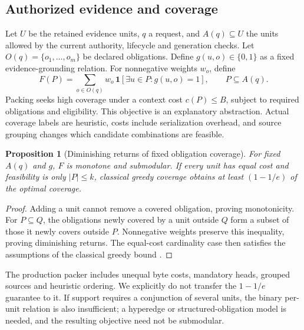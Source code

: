 \documentclass[11pt]{article}
\newtheorem{proposition}{Proposition}
\begin{document}
\subsection{Authorized evidence and coverage}
Let $U$ be the retained evidence units, $q$ a request, and $A(q)\subseteq U$ the units allowed by the current authority, lifecycle and generation checks. Let $O(q)=\{o_1,\ldots,o_m\}$ be declared obligations. Define $g(u,o)\in\{0,1\}$ as a fixed evidence-grounding relation. For nonnegative weights $w_o$, define
\begin{equation}
 F(P)=\sum_{o\in O(q)}w_o\,\mathbf{1}\!\left[\exists u\in P:g(u,o)=1\right],\qquad P\subseteq A(q).
 \label{eq:coverage}
\end{equation}
Packing seeks high coverage under a context cost $c(P)\leq B$, subject to required obligations and eligibility. This objective is an explanatory abstraction. Actual coverage labels are heuristic, costs include serialization overhead, and source grouping changes which candidate combinations are feasible.

\begin{proposition}[Diminishing returns of fixed obligation coverage]
For fixed $A(q)$ and $g$, $F$ is monotone and submodular. If every unit has equal cost and feasibility is only $|P|\leq k$, classical greedy coverage obtains at least $(1-1/e)$ of the optimal coverage.
\end{proposition}
\begin{proof}
Adding a unit cannot remove a covered obligation, proving monotonicity. For $P\subseteq Q$, the obligations newly covered by a unit outside $Q$ form a subset of those it newly covers outside $P$. Nonnegative weights preserve this inequality, proving diminishing returns. The equal-cost cardinality case then satisfies the assumptions of the classical greedy bound \citep{submodular}.
\end{proof}
The production packer includes unequal byte costs, mandatory heads, grouped sources and heuristic ordering. We explicitly do not transfer the $1-1/e$ guarantee to it. If support requires a conjunction of several units, the binary per-unit relation is also insufficient; a hyperedge or structured-obligation model is needed, and the resulting objective need not be submodular.
\end{document}
